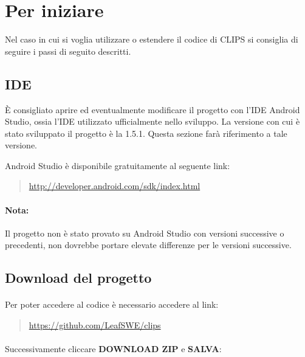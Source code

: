 \documentclass[../ManualeSviluppatore.tex]{subfiles}
\begin{document}
\section{Per iniziare}

	Nel caso in cui si voglia utilizzare o estendere il codice di CLIPS si consiglia di seguire i passi di seguito descritti.

	\subsection{IDE}
		È consigliato aprire ed eventualmente modificare il progetto con l'IDE Android Studio, ossia l'IDE utilizzato ufficialmente nello sviluppo. La versione con cui è stato sviluppato il progetto è la 1.5.1. Questa sezione farà riferimento a tale versione.
		
		Android Studio è disponibile gratuitamente al seguente link:
		\begin{quote}
			\centering
			\url{http://developer.android.com/sdk/index.html}
		\end{quote}
		
		\paragraph*{Nota:} 
			Il progetto non è stato provato su Android Studio con versioni successive o precedenti, non dovrebbe portare elevate differenze per le versioni successive.
		
		
		
		
	\subsection{Download del progetto}
		\paragraph*{}
			Per poter accedere al codice è necessario accedere al link:
		\begin{quote}
			\centering
			\url{https://github.com/LeafSWE/clips}
		\end{quote}

		\paragraph*{}
			Successivamente cliccare \textbf{DOWNLOAD ZIP} e \textbf{SALVA}:
			
\end{document}
